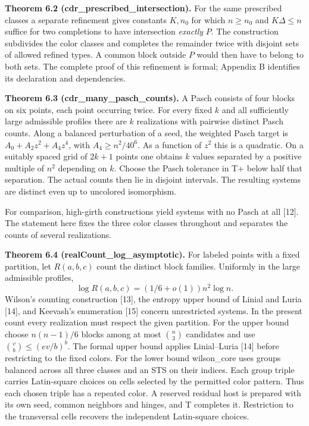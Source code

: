 \documentclass[english,11pt,a4paper]{article}
\begin{document}
\textbf{Theorem 6.2 (cdr\_prescribed\_intersection).} For the same prescribed classes a separate refinement gives constants \(K,n_0\) for which \(n\ge n_0\) and \(K\Delta\le n\) suffice for two completions to have intersection \emph{exactly} \(P\). The construction subdivides the color classes and completes the remainder twice with disjoint sets of allowed refined types. A common block outside \(P\) would then have to belong to both sets. The complete proof of this refinement is formal; Appendix B identifies its declaration and dependencies.

\textbf{Theorem 6.3 (cdr\_many\_pasch\_counts).} A Pasch consists of four blocks on six points, each point occurring twice. For every fixed \(k\) and all sufficiently large admissible profiles there are \(k\) realizations with pairwise distinct Pasch counts. Along a balanced perturbation of a seed, the weighted Pasch target is \(A_0+A_2z^2+A_4z^4\), with \(A_4\ge n^2/40^6\). As a function of \(z^2\) this is a quadratic. On a suitably spaced grid of \(2k+1\) points one obtains \(k\) values separated by a positive multiple of \(n^2\) depending on \(k\). Choose the Pasch tolerance in T+ below half that separation. The actual counts then lie in disjoint intervals. The resulting systems are distinct even up to uncolored isomorphism.

For comparison, high-girth constructions yield systems with no Pasch at all {[}12{]}. The statement here fixes the three color classes throughout and separates the counts of several realizations.

\textbf{Theorem 6.4 (realCount\_log\_asymptotic).} For labeled points with a fixed partition, let \(R(a,b,c)\) count the distinct block families. Uniformly in the large admissible profiles, \[\log R(a,b,c)=(1/6+o(1))n^2\log n.\] Wilson's counting construction {[}13{]}, the entropy upper bound of Linial and Luria {[}14{]}, and Keevash's enumeration {[}15{]} concern unrestricted systems. In the present count every realization must respect the given partition. For the upper bound choose \(n(n-1)/6\) blocks among at most \(\binom n3\) candidates and use \(\binom{v}{b}\le(ev/b)^b\). The formal upper bound applies Linial--Luria {[}14{]} before restricting to the fixed colors. For the lower bound wilson\_core uses groups balanced across all three classes and an STS on their indices. Each group triple carries Latin-square choices on cells selected by the permitted color pattern. Thus each chosen triple has a repeated color. A reserved residual host is prepared with its own seed, common neighbors and hinges, and T completes it. Restriction to the transversal cells recovers the independent Latin-square choices.
\end{document}
